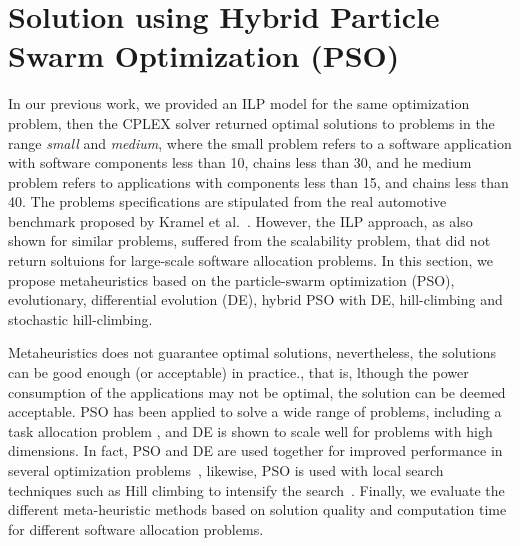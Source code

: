\section{Solution using Hybrid Particle Swarm Optimization (PSO)}\label{sec_solution}
In our previous work, we provided an ILP model for the same optimization problem, then the CPLEX solver returned optimal solutions to problems in the range \textit{small} and \textit{medium}, where the small problem refers to a software application with software components less than 10, chains less than 30, and he medium problem refers to applications with components less than 15, and chains less than 40. The problems specifications are stipulated from the real automotive benchmark proposed by Kramel et al.~\cite{Kramer2015RealFree}. However, the ILP approach, as also shown for similar problems, suffered from the scalability problem, that did not return soltuions for large-scale software allocation problems. In this section, we propose metaheuristics based on the particle-swarm optimization (PSO), evolutionary, differential evolution (DE), hybrid PSO with DE,  hill-climbing and stochastic hill-climbing. 

Metaheuristics does not guarantee optimal solutions, nevertheless, the solutions can be good enough (or acceptable) in practice., that is, lthough the power consumption of the applications may not be optimal, the solution can be deemed acceptable. PSO has been applied to solve a wide range of problems, including a task allocation problem \cite{yin2007task}, and DE is shown to scale well for problems with high dimensions. In fact, PSO and DE are used together for improved performance in several optimization problems~\cite{Sengupta2018ParticlePerspectives,Mirjalili2019ParticleOptimisation}, likewise, PSO is used with local search techniques such as Hill climbing to intensify the search~\cite{yin2007task}. Finally, we evaluate the different meta-heuristic methods based on solution quality and computation time for different software allocation problems.

